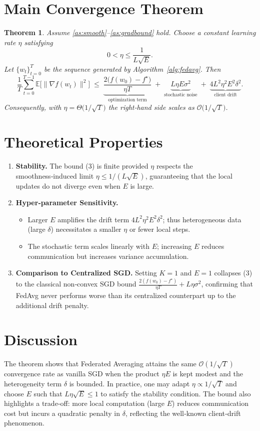 \documentclass{article}
\newtheorem{theorem}{Theorem}
\newcommand{\EE}{\mathbb{E}}
\begin{document}
\section*{Main Convergence Theorem}
\begin{theorem}\label{thm:main}
Assume \ref{as:smooth}–\ref{as:gradbound} hold.
Choose a constant learning rate $\eta$ satisfying
\[
0<\eta\le\frac{1}{L\sqrt{E}} .
\]
Let $\{w_t\}_{t=0}^{T}$ be the sequence generated by Algorithm~\ref{alg:fedavg}.
Then
\[
\frac{1}{T}\sum_{t=0}^{T-1}\EE\!\bigl[\|\nabla f(w_t)\|^2\bigr]
\;\le\;
\underbrace{\frac{2\bigl(f(w_0)-f^\star\bigr)}{\eta T}}_{\text{optimization term}}
\;+\;
\underbrace{L\eta E\sigma^2}_{\text{stochastic noise}}
\;+\;
\underbrace{4L^2\eta^2E^2\delta^2}_{\text{client drift}} .
\tag{3}
\]
Consequently, with $\eta= \Theta\!\bigl(1/\sqrt{T}\bigr)$ the right‑hand side scales as
$\mathcal O\!\bigl(1/\sqrt{T}\bigr)$.
\end{theorem}

\section*{Theoretical Properties}
\begin{enumerate}[label=\arabic*.]
\item \textbf{Stability.} The bound (3) is finite provided $\eta$ respects the smoothness‑induced limit $\eta\le 1/(L\sqrt{E})$, guaranteeing that the local updates do not diverge even when $E$ is large.
\item \textbf{Hyper‑parameter Sensitivity.}
    \begin{itemize}
        \item Larger $E$ amplifies the drift term $4L^2\eta^2E^2\delta^2$; thus heterogeneous data (large $\delta$) necessitates a smaller $\eta$ or fewer local steps.
        \item The stochastic term scales linearly with $E$; increasing $E$ reduces communication but increases variance accumulation.
    \end{itemize}
\item \textbf{Comparison to Centralized SGD.}
    Setting $K=1$ and $E=1$ collapses (3) to the classical non‑convex SGD bound
    $\frac{2(f(w_0)-f^\star)}{\eta T}+L\eta\sigma^2$,
    confirming that FedAvg never performs worse than its centralized counterpart up to the additional drift penalty.
\end{enumerate}

\section*{Discussion}
The theorem shows that Federated Averaging attains the same $\mathcal O(1/\sqrt{T})$ convergence rate as vanilla SGD when the product $\eta E$ is kept modest and the heterogeneity term $\delta$ is bounded. In practice, one may adapt $\eta\propto 1/\sqrt{T}$ and choose $E$ such that $L\eta\sqrt{E}\le 1$ to satisfy the stability condition. The bound also highlights a trade‑off: more local computation (large $E$) reduces communication cost but incurs a quadratic penalty in $\delta$, reflecting the well‑known client‑drift phenomenon.
\end{document}
